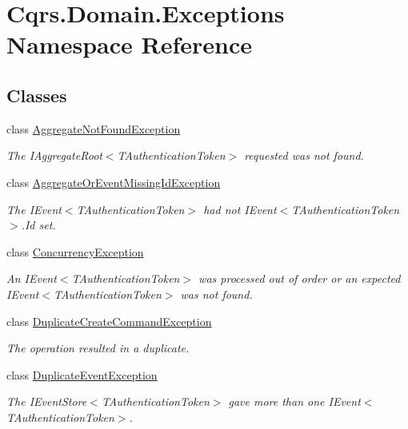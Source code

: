 \hypertarget{namespaceCqrs_1_1Domain_1_1Exceptions}{}\section{Cqrs.\+Domain.\+Exceptions Namespace Reference}
\label{namespaceCqrs_1_1Domain_1_1Exceptions}
\subsection*{Classes}
\begin{DoxyCompactItemize}
\item 
class \hyperlink{classCqrs_1_1Domain_1_1Exceptions_1_1AggregateNotFoundException}{Aggregate\+Not\+Found\+Exception}
\begin{DoxyCompactList}\small\item\em The I\+Aggregate\+Root$<$\+T\+Authentication\+Token$>$ requested was not found. \end{DoxyCompactList}\item 
class \hyperlink{classCqrs_1_1Domain_1_1Exceptions_1_1AggregateOrEventMissingIdException}{Aggregate\+Or\+Event\+Missing\+Id\+Exception}
\begin{DoxyCompactList}\small\item\em The I\+Event$<$\+T\+Authentication\+Token$>$ had not I\+Event$<$\+T\+Authentication\+Token$>$.\+Id set. \end{DoxyCompactList}\item 
class \hyperlink{classCqrs_1_1Domain_1_1Exceptions_1_1ConcurrencyException}{Concurrency\+Exception}
\begin{DoxyCompactList}\small\item\em An I\+Event$<$\+T\+Authentication\+Token$>$ was processed out of order or an expected I\+Event$<$\+T\+Authentication\+Token$>$ was not found. \end{DoxyCompactList}\item 
class \hyperlink{classCqrs_1_1Domain_1_1Exceptions_1_1DuplicateCreateCommandException}{Duplicate\+Create\+Command\+Exception}
\begin{DoxyCompactList}\small\item\em The operation resulted in a duplicate. \end{DoxyCompactList}\item 
class \hyperlink{classCqrs_1_1Domain_1_1Exceptions_1_1DuplicateEventException}{Duplicate\+Event\+Exception}
\begin{DoxyCompactList}\small\item\em The I\+Event\+Store$<$\+T\+Authentication\+Token$>$ gave more than one I\+Event$<$\+T\+Authentication\+Token$>$. \end{DoxyCompactList}\item 

\end{DoxyCompactItemize}
